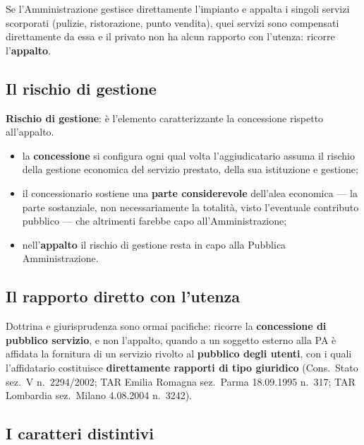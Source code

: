 
Se l'Amministrazione gestisce direttamente l'impianto e appalta i singoli servizi scorporati
(pulizie, ristorazione, punto vendita), quei servizi sono compensati direttamente da essa e il
privato non ha alcun rapporto con l'utenza: ricorre l'\textbf{appalto}.

\subsection{Il rischio di gestione}

\textbf{Rischio di gestione}: è l'elemento caratterizzante la concessione rispetto all'appalto.

\begin{itemize}
  \item la \textbf{concessione} si configura ogni qual volta l'aggiudicatario assuma il rischio
    della gestione economica del servizio prestato, della sua istituzione e gestione;
  \item il concessionario sostiene una \textbf{parte considerevole} dell'alea economica --- la
    parte sostanziale, non necessariamente la totalità, visto l'eventuale contributo pubblico ---
    che altrimenti farebbe capo all'Amministrazione;
  \item nell'\textbf{appalto} il rischio di gestione resta in capo alla Pubblica Amministrazione.
\end{itemize}

\subsection{Il rapporto diretto con l'utenza}

Dottrina e giurisprudenza sono ormai pacifiche: ricorre la \textbf{concessione di pubblico
servizio}, e non l'appalto, quando a un soggetto esterno alla PA è affidata la fornitura di un
servizio rivolto al \textbf{pubblico degli utenti}, con i quali l'affidatario costituisce
\textbf{direttamente rapporti di tipo giuridico} (Cons.\ Stato sez.\ V n.\ 2294/2002; TAR Emilia
Romagna sez.\ Parma 18.09.1995 n.\ 317; TAR Lombardia sez.\ Milano 4.08.2004 n.\ 3242).

\subsection{I caratteri distintivi}

